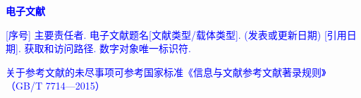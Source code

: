 \begin{bibprint}
\printbibliography [keyword={newspaper},heading=none] 

\textcolor{blue}{\textbf{电子文献}}

\noindent\textcolor{blue}{[序号] 主要责任者. 电子文献题名[文献类型/载体类型]. (发表或更新日期) [引用日期]. 获取和访问路径. 数字对象唯一标识符. }
\cite{yaoboyuan}

\printbibliography [keyword={online},heading=none] 

\textcolor{blue}{关于参考文献的未尽事项可参考国家标准《信息与文献参考文献著录规则》（GB/T 7714—2015）}

\end{bibprint}
